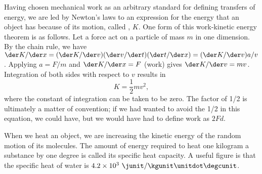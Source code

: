 Having chosen mechanical work as an arbitrary standard for defining
transfers of energy, we are led by Newton's laws to an expression for
the energy that an object has because of its motion, called ,
$K$. One form of this work-kinetic energy theorem is as follows. Let a force act on a particle of
mass $m$ in one dimension. By the chain rule, we
have $\der K/\der x=(\der K/\der v)(\der v/\der t)(\der t/\der x)=(\der K/\der v)a/v$. 
Applying  $a=F/m$ and $\der K/\der x=F$ (work) gives $\der K/\der v=mv$.
Integration of both sides with respect to $v$ results in
\begin{equation}
  K = \frac{1}{2}mv^2,
\end{equation}
where the constant of integration can be taken to be zero.
The factor of 1/2 is ultimately a matter of convention; if we had wanted to avoid
the 1/2 in this equation, we could have, but we would have had to define work as
$2Fd$.

When we heat an object, we are increasing the kinetic energy of the random motion
of its molecules. The amount of energy required to heat one kilogram a substance by one degree
is called its specific heat capacity. A useful figure is that the specific heat of water
is $4.2\times10^3\ \junit/\kgunit\unitdot\degcunit$.


